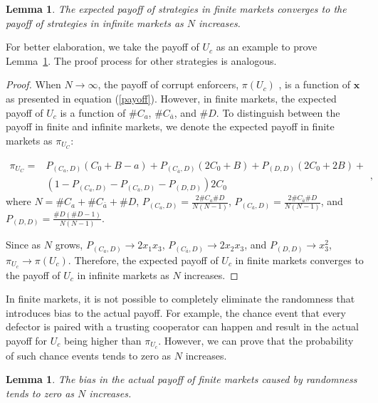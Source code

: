 \documentclass[letterpaper,10pt]{article}
\numberwithin{equation}{section}
\newtheorem{lemma}[theorem]{Lemma}
\begin{document}
\begin{lemma}\label{Converge1}
    The expected payoff of strategies in finite markets converges to the payoff of strategies in infinite markets as $N$ increases.
\end{lemma}

For better elaboration, we take the payoff of $ U_{c} $ as an example to prove Lemma~\ref{Converge1}. The proof process for other strategies is analogous.

\begin{proof}
    When $ N \to \infty $, the payoff of corrupt enforcers, $ \pi(U_{c}) $ , is a function of $ \mathbf{x} $ as presented in equation (\ref{payoff}). However, in finite markets, the expected payoff of $ U_{c} $ is a function of \#$ C_{a} $, \#$ C_{\bar{a}} $, and \#$ D $. To distinguish between the payoff in finite and infinite markets, we denote the expected payoff in finite markets as $ \pi_{U_{C}} $:
    
    \begin{equation}
    \label{payoffFini} 
        \begin{split}
            \pi_{U_{C}} = 
            & P_{(C_{a},D)}(C_{0}+B-a) + P_{(C_{\bar{a}}, D)}(2C_{0}+B) + P_{(D, D)}(2C_{0}+2B) + \\
            & (1-P_{(C_{a},D)}-P_{(C_{\bar{a}}, D)}-P_{(D, D)})2C_{0}
        \end{split},
    \end{equation}
    where $ N = \#C_{a} + \#C_{\bar{a}} + \#D $, $ P_{(C_{a},D)} = \frac{2\#C_{a}\#D}{N(N-1)} $, $ P_{(C_{\bar{a}}, D)} = \frac{2\#C_{\bar{a}}\#D}{N(N-1)} $, and $ P_{(D, D)} = \frac{\#D(\#D-1)}{N(N-1)} $.

    Since as $ N $ grows, $ P_{(C_{a},D)} \to 2x_{1}x_{3} $, $ P_{(C_{\bar{a}}, D)} \to 2x_{2}x_{3} $, and $ P_{(D, D)} \to x_{3}^2 $, $ \pi_{U_{c}} \to \pi(U_{c}) $. Therefore, the expected payoff of $ U_{c} $ in finite markets converges to the payoff of $ U_{c} $ in infinite markets as $ N $ increases.
\end{proof}

In finite markets, it is not possible to completely eliminate the randomness that introduces bias to the actual payoff. For example, the chance event that every defector is paired with a trusting cooperator can happen and result in the actual payoff for $ U_{c} $ being higher than $ \pi_{U_{c}} $. However, we can prove that the probability of such chance events tends to zero as $ N $ increases.

\begin{lemma}
    \label{Converge2}
    The bias in the actual payoff of finite markets caused by randomness tends to zero as $ N $ increases.
\end{lemma}
\end{document}
